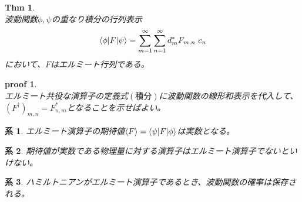 \documentclass{jsarticle}
\newtheorem{thm}{Thm}[section]
\newtheorem{co}{系}[section]
\newtheorem{pf}{proof}[section]
\begin{document}
\newpage
\begin{thm}~\\
    波動関数\(\phi,\psi\)の重なり積分の行列表示
    \begin{equation}
        \braket{\phi|F|\psi}=\sum_{m=1}^{\infty}\sum_{n=1}^{\infty}d_{m}^{*}F_{m,n}~c_{n}
    \end{equation}
    において、\(F\)はエルミート行列である。
\end{thm}
\begin{pf}~\\
    エルミート共役な演算子の定義式\((積分)\)に波動関数の線形和表示を代入して、
    \(\left(F^{\dagger}\right)_{m,n}=F_{n,m}^{*}\)となることを示せばよい。
\end{pf}

\begin{co}エルミート演算子の期待値\(\braket{F}=\braket{\psi|F|\phi}\)は実数となる。
\end{co}

\begin{co}期待値が実数である物理量に対する演算子はエルミート演算子でないといけない。
\end{co}

\begin{co}ハミルトニアンがエルミート演算子であるとき、波動関数の確率は保存される。
\end{co}
\end{document}
